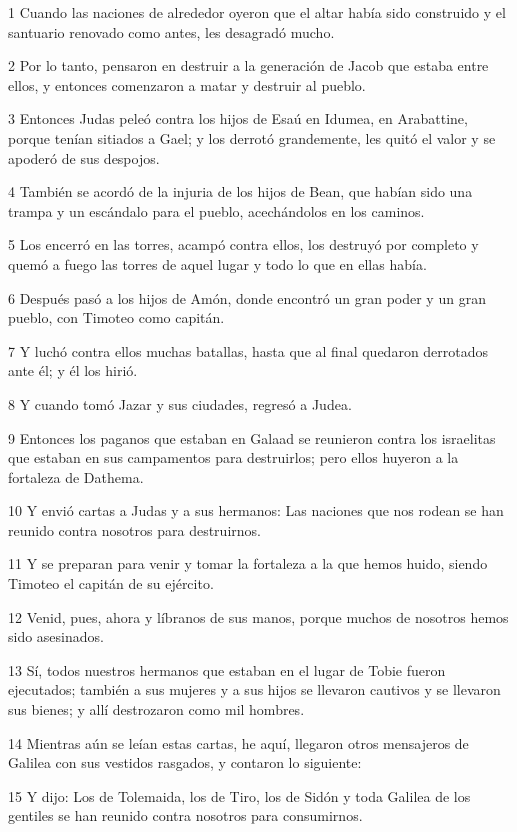 \par 1 Cuando las naciones de alrededor oyeron que el altar había sido construido y el santuario renovado como antes, les desagradó mucho.
\par 2 Por lo tanto, pensaron en destruir a la generación de Jacob que estaba entre ellos, y entonces comenzaron a matar y destruir al pueblo.
\par 3 Entonces Judas peleó contra los hijos de Esaú en Idumea, en Arabattine, porque tenían sitiados a Gael; y los derrotó grandemente, les quitó el valor y se apoderó de sus despojos.
\par 4 También se acordó de la injuria de los hijos de Bean, que habían sido una trampa y un escándalo para el pueblo, acechándolos en los caminos.
\par 5 Los encerró en las torres, acampó contra ellos, los destruyó por completo y quemó a fuego las torres de aquel lugar y todo lo que en ellas había.
\par 6 Después pasó a los hijos de Amón, donde encontró un gran poder y un gran pueblo, con Timoteo como capitán.
\par 7 Y luchó contra ellos muchas batallas, hasta que al final quedaron derrotados ante él; y él los hirió.
\par 8 Y cuando tomó Jazar y sus ciudades, regresó a Judea.
\par 9 Entonces los paganos que estaban en Galaad se reunieron contra los israelitas que estaban en sus campamentos para destruirlos; pero ellos huyeron a la fortaleza de Dathema.
\par 10 Y envió cartas a Judas y a sus hermanos: Las naciones que nos rodean se han reunido contra nosotros para destruirnos.
\par 11 Y se preparan para venir y tomar la fortaleza a la que hemos huido, siendo Timoteo el capitán de su ejército.
\par 12 Venid, pues, ahora y líbranos de sus manos, porque muchos de nosotros hemos sido asesinados.
\par 13 Sí, todos nuestros hermanos que estaban en el lugar de Tobie fueron ejecutados; también a sus mujeres y a sus hijos se llevaron cautivos y se llevaron sus bienes; y allí destrozaron como mil hombres.
\par 14 Mientras aún se leían estas cartas, he aquí, llegaron otros mensajeros de Galilea con sus vestidos rasgados, y contaron lo siguiente:
\par 15 Y dijo: Los de Tolemaida, los de Tiro, los de Sidón y toda Galilea de los gentiles se han reunido contra nosotros para consumirnos.
